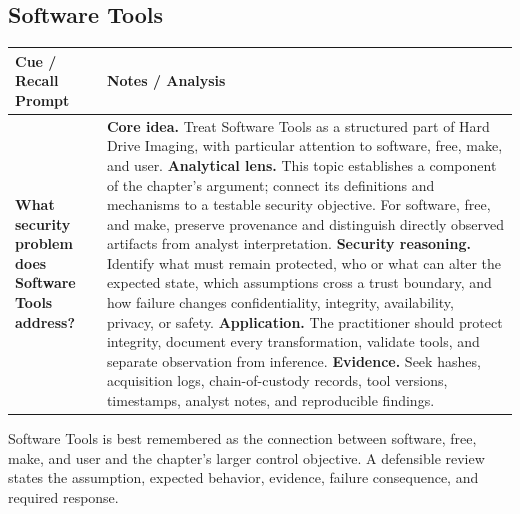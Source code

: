 \documentclass[11pt]{article}
\newcommand{\CornellHeader}{%
\rowcolor{Navy}\color{white}\bfseries Cue / Recall Prompt & \color{white}\bfseries Notes / Analysis\\\hline}
\newcommand{\CornellRow}[2]{%
\cellcolor{CueGray}\RaggedRight\textbf{#1} & \RaggedRight #2\\\hline}
\begin{document}
\subsection*{Software Tools}
\begin{longtable}{>{\RaggedRight\arraybackslash}p{}|>{\RaggedRight\arraybackslash}p{}}
\CornellHeader
\CornellRow{What security problem does Software Tools address?}{\textbf{Core idea.} Treat Software Tools as a structured part of Hard Drive Imaging, with particular attention to software, free, make, and user. \textbf{Analytical lens.} This topic establishes a component of the chapter's argument; connect its definitions and mechanisms to a testable security objective. For software, free, and make, preserve provenance and distinguish directly observed artifacts from analyst interpretation. \textbf{Security reasoning.} Identify what must remain protected, who or what can alter the expected state, which assumptions cross a trust boundary, and how failure changes confidentiality, integrity, availability, privacy, or safety. \textbf{Application.} The practitioner should protect integrity, document every transformation, validate tools, and separate observation from inference. \textbf{Evidence.} Seek hashes, acquisition logs, chain-of-custody records, tool versions, timestamps, analyst notes, and reproducible findings.}
\end{longtable}
\begin{topicsummary}
Software Tools is best remembered as the connection between software, free, make, and user and the chapter's larger control objective. A defensible review states the assumption, expected behavior, evidence, failure consequence, and required response.
\end{topicsummary}
\end{document}

